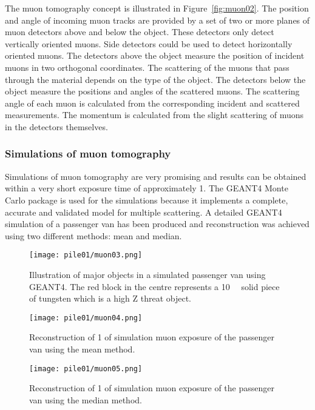 \documentclass[twoside,titlepage,11pt,twocolumn,a4paper]{article}
\begin{document}
The muon tomography concept is illustrated in
Figure~\ref{fig:muon02}. The position and angle of incoming muon
tracks are provided by a set of two or more planes of muon detectors
above and below the object. These detectors only detect vertically
oriented muons. Side detectors could be used to detect horizontally
oriented muons. The detectors above the object measure the position of
incident muons in two orthogonal coordinates. The scattering of the
muons that pass through the material depends on the type of the
object. The detectors below the object measure the positions and
angles of the scattered muons. The scattering angle of each muon is
calculated from the corresponding incident and scattered
measurements. The momentum is calculated from the slight scattering of
muons in the detectors themselves. \citep{statisticalRec2007}

\subsubsection{Simulations of muon tomography}
Simulations of muon tomography are very promising and results can be
obtained within a very short exposure time of approximately
\unit{1}{\minute}. The GEANT4 Monte Carlo package is used for the
simulations because it implements a complete, accurate and validated
model for multiple scattering. A detailed GEANT4 simulation of a
passenger van has been produced and reconstruction was achieved using
two different methods: mean and median. \citep{statisticalRec2007}

\begin{figure}
  \texttt{[image: pile01/muon03.png]}
  \caption{Illustration of major objects in a simulated passenger van
    using GEANT4. The red block in the centre represents a
    \unit{10}{\cubic{\centi\metre}} solid piece of
    tungsten which is a high Z threat
    object. \citep{statisticalRec2007}}
\end{figure}
\begin{figure}
  \texttt{[image: pile01/muon04.png]}
  \caption{Reconstruction of \unit{1}{\minute} of simulation muon
    exposure of the passenger van using the mean
    method. \citep{statisticalRec2007}}
  \label{fig:muon04}
\end{figure}
\begin{figure}
  \texttt{[image: pile01/muon05.png]}
  \caption{Reconstruction of \unit{1}{\minute} of simulation muon
    exposure of the passenger van using the median
    method. \citep{statisticalRec2007}}
  \label{fig:muon05}
\end{figure}
\end{document}
